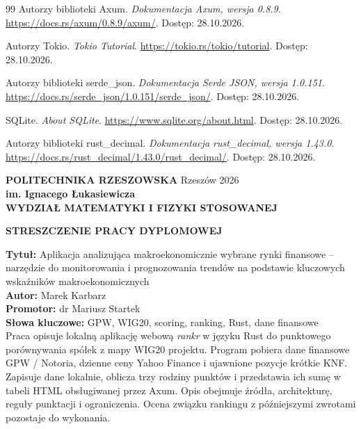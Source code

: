 \documentclass[12pt,a4paper,twoside]{report}
\newcommand{\AuthorName}{Marek Karbarz}
\newcommand{\SupervisorName}{dr Mariusz Startek}
\newcommand{\ThesisYear}{2026}
\newcommand{\ThesisTitle}{Aplikacja analizująca makroekonomicznie wybrane rynki finansowe – narzędzie do monitorowania i prognozowania trendów na podstawie kluczowych wskaźników makroekonomicznych}
\begin{document}
\begin{thebibliography}{99}
Autorzy biblioteki Axum.
\newblock \textit{Dokumentacja Axum, wersja 0.8.9}.
\newblock \url{https://docs.rs/axum/0.8.9/axum/}.
\newblock Dostęp: 28.10.2026.

Autorzy Tokio.
\newblock \textit{Tokio Tutorial}.
\newblock \url{https://tokio.rs/tokio/tutorial}.
\newblock Dostęp: 28.10.2026.

Autorzy biblioteki serde\_json.
\newblock \textit{Dokumentacja Serde JSON, wersja 1.0.151}.
\newblock \url{https://docs.rs/serde_json/1.0.151/serde_json/}.
\newblock Dostęp: 28.10.2026.

SQLite.
\newblock \textit{About SQLite}.
\newblock \url{https://www.sqlite.org/about.html}.
\newblock Dostęp: 28.10.2026.

Autorzy biblioteki rust\_decimal.
\newblock \textit{Dokumentacja rust\_decimal, wersja 1.43.0}.
\newblock \url{https://docs.rs/rust_decimal/1.43.0/rust_decimal/}.
\newblock Dostęp: 28.10.2026.

\end{thebibliography}

\cleardoublepage
\begingroup
\small
\linespread{1.0}\selectfont
\thispagestyle{empty}
\setlength{\parindent}{0in}
\setlength{\parskip}{0em}
{}

\textbf{POLITECHNIKA RZESZOWSKA} \hfill Rzeszów \ThesisYear \\
\textbf{im. Ignacego Łukasiewicza} \\
\textbf{WYDZIAŁ MATEMATYKI I FIZYKI STOSOWANEJ} \\

\begin{center}
    \textbf{STRESZCZENIE PRACY DYPLOMOWEJ}
\end{center}

\textbf{Tytuł:} \ThesisTitle \\
\textbf{Autor:} \AuthorName \\
\textbf{Promotor:} \SupervisorName \\
\textbf{Słowa kluczowe:} GPW, WIG20, scoring, ranking, Rust, dane finansowe
\\

Praca opisuje lokalną aplikację webową \textit{rankr} w języku Rust do punktowego porównywania spółek z mapy WIG20 projektu. Program pobiera dane finansowe GPW / Notoria, dzienne ceny Yahoo Finance i ujawnione pozycje krótkie KNF. Zapisuje dane lokalnie, oblicza trzy rodziny punktów i przedstawia ich sumę w tabeli HTML obsługiwanej przez Axum. Opis obejmuje źródła, architekturę, reguły punktacji i ograniczenia. Ocena związku rankingu z późniejszymi zwrotami pozostaje do wykonania.
\end{document}
